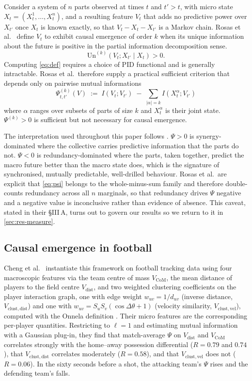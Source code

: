 \documentclass[11pt,a4paper]{article}
\newcommand{\Vcom}{V_{\mathrm{CoM}}}
\newcommand{\Vdist}{V_{\mathrm{dist}}}
\newcommand{\Vcd}{V_{\mathrm{clust,dist}}}
\newcommand{\Vcv}{V_{\mathrm{clust,vel}}}
\begin{document}
Consider a system of $n$ parts observed at times $t$ and $t'>t$, with micro state
$X_t=(X^1_t,\dots,X^n_t)$, and a resulting feature $V_t$ that adds no
predictive power over $X_{t'}$ once $X_t$ is known exactly, so that $V_t-X_t-X_{t'}$ is a
Markov chain. Rosas et al.\ \cite{rosas2020} define $V_t$ to exhibit causal emergence of
order $k$ when its unique information about the future is positive in the partial information decomposition sense.
\begin{equation}
\mathrm{Un}^{(k)}(V_t; X_{t'} \mid X_t) > 0 .
\label{eq:def}
\end{equation}
Computing \eqref{eq:def} requires a choice of PID functional and is generally intractable. 
Rosas et al.\ therefore supply a practical sufficient criterion that
depends only on pairwise mutual informations
\begin{equation}
\Psi^{(k)}_{t,t'}(V) \;:=\; I(V_t;V_{t'}) \;-\; \sum_{|\alpha|=k} I\!\left(X^\alpha_t; V_{t'}\right)
\label{eq:psi}
\end{equation}
where $\alpha$ ranges over subsets of parts of size $k$ and $X^\alpha_t$ is their joint
state. $\Psi^{(k)}>0$ is sufficient but not necessary for causal emergence.

The interpretation used throughout this paper follows \cite{rosas2020,cheng2025}.
$\Psi>0$ is synergy-dominated where the collective carries predictive information that the
parts do not. $\Psi<0$ is redundancy-dominated where the parts, taken together, predict the
macro future better than the macro state does, which is the signature of synchronised,
mutually predictable, well-drilled behaviour. Rosas et al.\ are explicit that
\eqref{eq:psi} belongs to the whole-minus-sum family and therefore double-counts
redundancy across all $n$ marginals, so that redundancy drives $\Psi$ negative and a
negative value is inconclusive rather than evidence of absence. This caveat, stated in
their \S III\,A, turns out to govern our results so we return to it in
\cref{sec:res-measure}.

\subsection{Causal emergence in football}

Cheng et al.\ \cite{cheng2025} instantiate this framework on football tracking data using
four macroscopic features via the team centre of mass $\Vcom$, the mean distance of players
to the field centre $\Vdist$, and two weighted clustering coefficients on the player
interaction graph, one with edge weight $w_{uv}=1/d_{uv}$ (inverse distance, $\Vcd$) and
one with $w_{uv}=S_uS_v(\cos\Delta\theta+1)$ (velocity similarity, $\Vcv$), computed with
the Onnela definition \cite{onnela2005}. Their micro features are the corresponding
per-player quantities. Restricting to $\ell=1$ and estimating mutual information with a
Gaussian plug-in, they find that match-average $\Psi$ on $\Vdist$ and $\Vcom$ correlates
strongly with the home--away possession differential ($R=0.79$ and $0.74$), that $\Vcd$
correlates moderately ($R=0.58$), and that $\Vcv$ does not ($R=0.06$). In the sixty
seconds before a shot, the attacking team's $\Psi$ rises and the defending team's falls.
\end{document}
